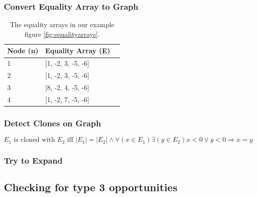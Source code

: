 \subsubsection{Convert Equality Array to Graph}
\begin{table}[H]
\begin{center}
 \caption{The equality arrays in our example figure \ref{fig:equalityarrays}.} \label{table:equalityarrays2}
 \medskip
\begin{tabular}{|l|l|l|}
\hline
Node (n) & Equality Array (E) \\ \hline
1        & {[}1, -2, 3, -5, -6{]} \\ \hline
2        & {[}1, -2, 3, -5, -6{]} \\ \hline
3        & {[}8, -2, 4, -5, -6{]} \\ \hline
4        & {[}1, -2, 7, -5, -6{]} \\ \hline
\end{tabular}
\end{center}
\end{table}

\subsubsection{Detect Clones on Graph}
\begin{equation}\label{eq:t2rcloneequality}
E_1\text{ is cloned with }E_2\text{ iff }|E_1|=|E_2| \land \forall (x \in E_1) \exists (y \in E_2) x<0 \lor y<0 \Rightarrow x=y
\end{equation}

\subsubsection{Try to Expand}

\subsection{Checking for type 3 opportunities}
